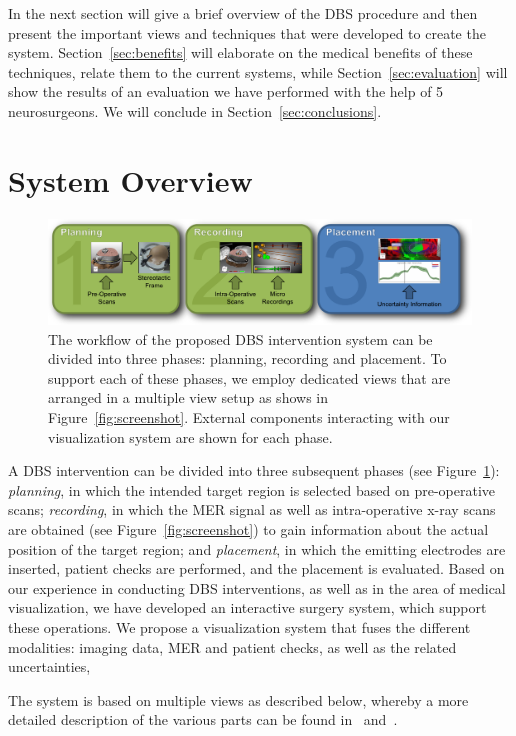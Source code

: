 \documentclass{egpubl}
\begin{document}
In the next section will give a brief overview of the DBS procedure and then present the important views and techniques that were developed to create the system. Section~\ref{sec:benefits} will elaborate on the medical benefits of these techniques, relate them to the current systems, while Section~\ref{sec:evaluation} will show the results of an evaluation we have performed with the help of 5 neurosurgeons. We will conclude in Section~\ref{sec:conclusions}.


\section{System Overview}\label{sec:setup}
\begin{figure}[t]
    \centering
    \includegraphics[width=0.95\linewidth]{figures/workflow}
    \caption{The workflow of the proposed DBS intervention system can be divided into three phases: planning, recording and placement. To support each of these phases, we employ dedicated views that are arranged in a multiple view setup as shows in Figure~\ref{fig:screenshot}. External components interacting with our visualization system are shown for each phase.}
    \label{fig:workflow}
\end{figure}

A DBS intervention can be divided into three subsequent phases (see Figure~\ref{fig:workflow}): \emph{planning}, in which the intended target region is selected based on pre-operative scans; \emph{recording}, in which the MER signal as well as intra-operative x-ray scans are obtained (see Figure~\ref{fig:screenshot}) to gain information about the actual position of the target region; and \emph{placement}, in which the emitting electrodes are inserted, patient checks are performed, and the placement is evaluated. Based on our experience in conducting DBS interventions, as well as in the area of medical visualization, we have developed an interactive surgery system, which support these operations. We propose
a visualization system that fuses the different modalities: imaging
data, MER and patient checks, as well as the related uncertainties,


The system is based on multiple views as described below, whereby a more detailed description of the various parts can be found in~\cite{Bock12} and~\cite{Bock13}.
\end{document}
